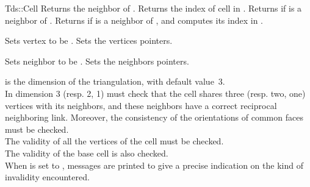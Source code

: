 \begin{ccClass}{Tds::Cell}
{Returns  the neighbor  of \ccVar.
}
\ccGlue
{}
{Returns the index of cell  in \ccVar.
}
\ccGlue
{}
{Returns  if  is a neighbor of \ccVar.}
\ccGlue
{}
{Returns  if  is a neighbor of \ccVar,  and
computes its index  in \ccVar.}


{Sets vertex  to be .
}
\ccGlue
{}
{Sets the vertices pointers.}

{Sets neighbor  to be .
}
\ccGlue
{}
{Sets the neighbors pointers.}

{ is the dimension of the triangulation, with default
value~3.\\
In dimension 3 (resp. 2, 1) must check that the cell shares three
(resp. two, one) vertices with its neighbors, and these neighbors have
a correct reciprocal neighboring link. Moreover, the consistency of
the orientations of common faces must be checked.\\
The validity of all the vertices of the cell must be checked.\\
The validity of the base cell is also checked.\\ 
When  is set to , messages are printed to give
a precise indication on the kind of invalidity encountered.}

	\end{ccClass} 


